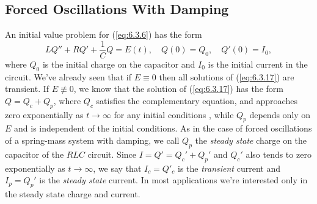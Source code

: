 \documentclass{ximera}
\begin{document}
\subsection*{Forced Oscillations With Damping}

An initial value problem for (\ref{eq:6.3.6})  has the form
\begin{equation} \label{eq:6.3.17}
 LQ''+RQ'+\frac{1}{C}Q=E(t),\quad Q(0)=Q_0,\quad Q'(0)=I_0,
\end{equation}
where $Q_0$ is the initial charge on the capacitor and $I_0$ is the
initial current in the circuit. We've already seen that if $E\equiv0$
then all solutions of (\ref{eq:6.3.17}) are transient. If
$E\not\equiv0$, we know that the solution of (\ref{eq:6.3.17}) has
the form $Q=Q_c+Q_p$, where $Q_c$ satisfies the complementary
equation, and approaches zero exponentially as $t\rightarrow\infty$ for any
initial conditions , while $Q_p$ depends only on $E$ and is
independent of the initial conditions. As in the case of forced
oscillations of a spring-mass system with damping, we call $Q_p$ the \textit{steady state} charge on the capacitor of the $RLC$ circuit. Since
$I=Q'=Q_c'+Q_p'$ and $Q_c'$ also tends to zero exponentially as
$t\rightarrow\infty$, we say that $I_c=Q'_c$ is the \textit{transient} current
and $I_p=Q_p'$ is the \textit{steady state} current. In most
applications we're interested only in the steady state charge and
current.
\end{document}
